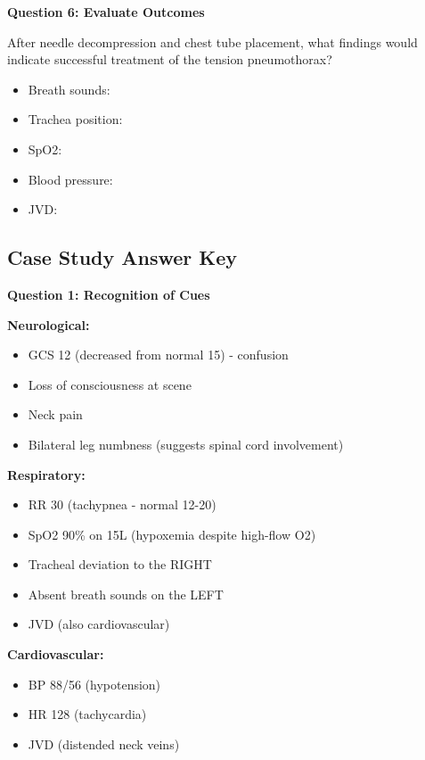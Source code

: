 \documentclass[11pt]{article}
\begin{document}
\vspace{0.5cm}
\textbf{Question 6: Evaluate Outcomes}

After needle decompression and chest tube placement, what findings would indicate successful treatment of the tension pneumothorax?

\begin{itemize}
    \item Breath sounds: \underline{\hspace{8cm}}
    \item Trachea position: \underline{\hspace{8cm}}
    \item SpO2: \underline{\hspace{8cm}}
    \item Blood pressure: \underline{\hspace{8cm}}
    \item JVD: \underline{\hspace{8cm}}
\end{itemize}

\newpage
\subsection*{Case Study Answer Key}

\textbf{Question 1: Recognition of Cues}

\textbf{Neurological:}
\begin{itemize}
    \item GCS 12 (decreased from normal 15) - confusion
    \item Loss of consciousness at scene
    \item Neck pain
    \item Bilateral leg numbness (suggests spinal cord involvement)
\end{itemize}

\textbf{Respiratory:}
\begin{itemize}
    \item RR 30 (tachypnea - normal 12-20)
    \item SpO2 90\% on 15L (hypoxemia despite high-flow O2)
    \item Tracheal deviation to the RIGHT
    \item Absent breath sounds on the LEFT
    \item JVD (also cardiovascular)
\end{itemize}

\textbf{Cardiovascular:}
\begin{itemize}
    \item BP 88/56 (hypotension)
    \item HR 128 (tachycardia)
    \item JVD (distended neck veins)
\end{itemize}
\end{document}
